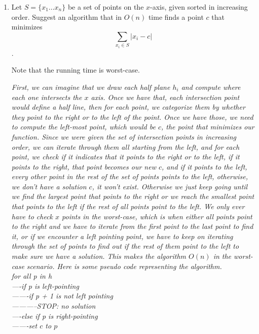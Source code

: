 \documentclass[11pt,epic,leqno,eepic,psfig,]{article}
\newcommand{\ans}[1]{{\color{brown}{\bf\Large Answer:} \sl  #1 \color{black}}}
\renewcommand{\i}{\item}
\begin{document}
\begin{enumerate}
\begin{enumerate}
    If yes, what is the expected running time for finding this function? Prove your answer. 
    

    
    \i What is the expected  running time of your algorithm? 
    
    
    \i Assume $m=n^3$. We pick at random a function $h$ from a universal family. For two files $x, y\in F$ we 
    define a random variable $c_{xy}(h)$ which is $1$ if $h(x)=h(y)$ and is $0$ if $h(x)\neq h(y)$. What is $E(c_{xy}(h))$?
\end{enumerate}







\i Let $S=\{x_1\dots x_n\}$ be a set of points on the $x$-axis, given sorted in increasing order. Suggest an algorithm that in $O(n)$ time finds a point $c$ that minimizes 
$$\sum_{x_i\in S} |x_i-c|$$. 

Note that the running time is worst-case. 

\ans{First, we can imagine that we draw each half plane $h_i$ and compute where each one intersects the $x$ axis. Once we have that, each intersection point would define a half line, then for each point, we categorize them by whether they point to the right or to the left of the point. Once we have those, we need to compute the left-most point, which would be $c$, the point that minimizes our function. Since we were given the set of intersection points in increasing order, we can iterate through them all starting from the left, and for each point, we check if it indicates that it points to the right or to the left, if it points to the right, that point becomes our new $c$, and if it points to the left, every other point in the rest of the set of points points to the left, otherwise, we don't have a solution $c$, it won't exist. Otherwise we just keep going until we find the largest point that points to the right or we reach the smallest point that points to the left if the rest of all points point to the left. We only ever have to check $x$ points in the worst-case, which is when either all points point to the right and we have to iterate from the first point to the last point to find it, or if we encounter a left pointing point, we have to keep on iterating through the set of points to find out if the rest of them point to the left to make sure we have a solution. This makes the algorithm $O(n)$ in the worst-case scenario. Here is some pseudo code representing the algorithm.
\\ for all p in h
\\----if p is left-pointing
\\-------if p + 1 is not left pointing
\\-----------STOP: no solution
\\----else if p is right-pointing
\\-------set $c$ to $p$}




\end{enumerate}
\end{document}
